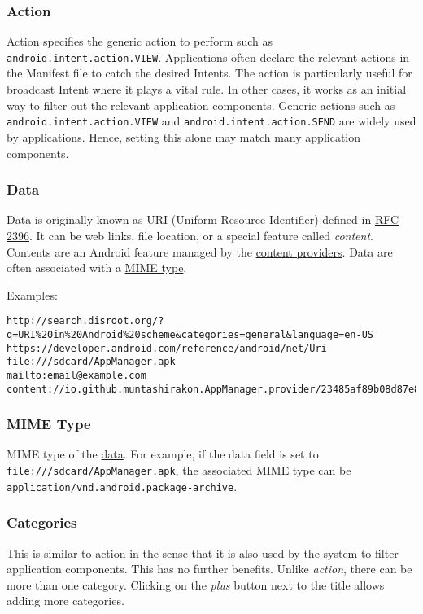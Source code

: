 \subsubsection{Action}\label{subsubsec:action} %
Action specifies the generic action to perform such as \texttt{android.intent.action.VIEW}. Applications often declare
the relevant actions in the Manifest file to catch the desired Intents. The action is particularly useful for broadcast
Intent where it plays a vital rule. In other cases, it works as an initial way to filter out the relevant application components.
Generic actions such as \texttt{android.intent.action.VIEW} and \texttt{android.intent.action.SEND} are widely used by applications.
Hence, setting this alone may match many application components.

\subsubsection{Data}\label{subsubsec:data} %
Data is originally known as URI (Uniform Resource Identifier) defined in \href{http://www.faqs.org/rfcs/rfc2396.html}{RFC 2396}.
It can be web links, file location, or a special feature called \textit{content}. Contents are an Android feature managed by the \hyperref[appdetails:providers]{content providers}.
Data are often associated with a \hyperref[subsubsec:mime-type]{MIME type}.

Examples:
\begin{Verbatim}
http://search.disroot.org/?q=URI%20in%20Android%20scheme&categories=general&language=en-US
https://developer.android.com/reference/android/net/Uri
file:///sdcard/AppManager.apk
mailto:email@example.com
content://io.github.muntashirakon.AppManager.provider/23485af89b08d87e898a90c7e/AppManager.apk
\end{Verbatim}

\subsubsection{MIME Type}\label{subsubsec:mime-type} %
MIME type of the \hyperref[subsubsec:data]{data}. For example, if the data field is set to \texttt{file:///sdcard/AppManager.apk},
the associated MIME type can be \texttt{application/vnd.android.package-archive}.

\subsubsection{Categories} %
This is similar to \hyperref[subsubsec:action]{action} in the sense that it is also used by the system to filter application components.
This has no further benefits. Unlike \textit{action}, there can be more than one category. Clicking on the \textit{plus} button next to the title allows adding more categories.

